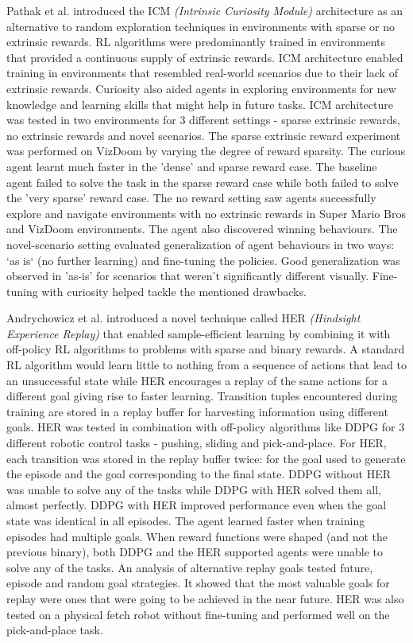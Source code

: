 \documentclass[12pt,a4paper]{article}
\begin{document}
Pathak et al. \cite{cdl} introduced the ICM \textit{(Intrinsic Curiosity Module)} 
architecture as an alternative to random exploration techniques in environments with 
sparse or no extrinsic rewards. RL algorithms were predominantly trained in environments that provided a continuous supply of extrinsic rewards. ICM architecture enabled training in environments that resembled real-world scenarios due to their lack of extrinsic rewards. Curiosity also aided agents in exploring environments for new knowledge and learning skills that might help in future tasks. ICM architecture 
was tested in two environments for 3 different settings - sparse extrinsic rewards, 
no extrinsic rewards and novel scenarios. The sparse extrinsic reward experiment was 
performed on VizDoom by varying the degree of reward sparsity. The curious agent learnt much faster in the 'dense' and sparse reward case. The baseline agent failed to solve the task in the sparse reward case while both failed to solve the 'very sparse' reward case. The no reward setting saw agents successfully explore and navigate environments with no extrinsic rewards in Super Mario Bros and VizDoom environments. The agent also discovered winning behaviours. The novel-scenario setting evaluated 
generalization of agent behaviours in two ways: `as is` (no further learning) and 
fine-tuning the policies. Good generalization was observed in 'as-is' for scenarios 
that weren't significantly different visually. Fine-tuning with curiosity helped 
tackle the mentioned drawbacks.

Andrychowicz et al. \cite{her} introduced a novel technique called HER 
\textit{(Hindsight Experience Replay)} that enabled sample-efficient learning by 
combining it with off-policy RL algorithms to problems with sparse and binary 
rewards. A standard RL algorithm would learn little to nothing from a sequence of 
actions that lead to an unsuccessful state while HER encourages a replay of the same
actions for a different goal giving rise to faster learning. Transition tuples 
encountered during training are stored in a replay buffer for harvesting 
information using different goals. HER was tested in combination with off-policy 
algorithms like DDPG for 3 different robotic control tasks - pushing, sliding and pick-and-place.
For HER, each transition was stored in the replay buffer twice: for the goal used to 
generate the episode and the goal corresponding to the final state. DDPG without 
HER was unable to solve any of the tasks while DDPG with HER solved them all, almost
perfectly. DDPG with HER improved 
performance even when the goal state was identical in all episodes. The agent 
learned faster when training episodes had multiple goals. When reward functions
were shaped (and not the previous binary), both DDPG and the HER supported agents
were unable to solve any of the tasks. An analysis of alternative replay goals
tested future, episode and random goal strategies. It showed
that the most valuable goals for replay were ones that were going to be achieved
in the near future. HER was also tested on a physical fetch robot without fine-tuning
and performed well on the pick-and-place task.
\end{document}
